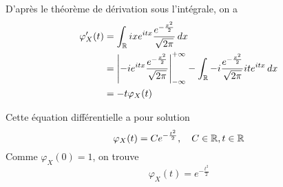 {\begin{td-sol}[]
\begin{enumerate}
            D'après le théorème de dérivation sous l'intégrale, on a
            \begin{equation*}
                \begin{aligned}
                    \varphi_X'(t)
                    &= \int_{\mathbb{R}} i x e^{itx} \frac{e^{-\frac{x^2}{2}}}{\sqrt{2\pi}}\mathop{}\!{d} x\\
                    &= {\mathopen{}\left|-i e^{itx} \frac{e^{-\frac{x^2}{2}}}{\sqrt{2\pi}}\right|\mathclose{}}_{-\infty}^{+\infty} - \int_{\mathbb{R}} -i \frac{e^{-\frac{x^2}{2}}}{\sqrt{2\pi}} i t e^{itx} \mathop{}\!{d} x\\
                    &= -t \varphi_X(t)
                \end{aligned}
            \end{equation*}

            Cette équation différentielle a pour solution
            \begin{equation*}
                \varphi_X(t) = C e^{-\frac{t^2}{2}}, \quad C\in\mathbb{R}, t\in\mathbb{R}
            \end{equation*}
            Comme \(\varphi_X(0) = 1\), on trouve
            \begin{equation*}
                \varphi_X(t) = e^{-\frac{t^2}{2}}
            \end{equation*}
        \end{enumerate}
    \end{td-sol}
}{}

